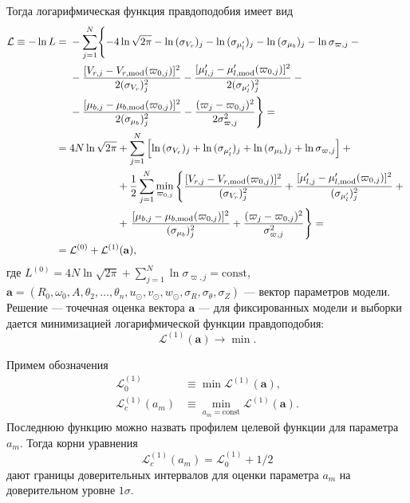 \documentclass[a4paper, oneside, 14pt]{article}
\begin{document}
Тогда логарифмическая функция правдоподобия имеет вид
%
{\allowdisplaybreaks
\begin{align}
  \label{eq:L}\nonumber
  \mathcal{L} \equiv -\ln{L} &=
  \begin{aligned}[t]
    &-\sum_{j=1}^N \Biggl\{ -4 \ln{\sqrt{2 \pi}} - \ln{(\sigma_{V_r})_j} - \ln{(\sigma_{\mu_l'})_j} - \ln{(\sigma_{\mu_b})_j} - \ln{\sigma_{\varpi,j}} - {}\\
    &-\frac{[ V_{r,j} - V_{r,\text{mod}}(\varpi_{0,j}) ]^2}{2 (\sigma_{V_r})_j^2} - \frac{[ \mu_{l,j}' - \mu_{l,\text{mod}}'(\varpi_{0,j}) ]^2}{2 (\sigma_{\mu_l'})_j^2} - {}\\
    &-\frac{[ \mu_{b,j} - \mu_{b,\text{mod}}(\varpi_{0,j}) ]^2}{2 (\sigma_{\mu_b})_j^2} - \frac{( \varpi_j - \varpi_{0,j} )^2}{2 \sigma_{\varpi,j}^2} \Biggr\} = {}
  \end{aligned}\\
  \nonumber
  &= 4 N \ln{\sqrt{2 \pi}}
  \begin{aligned}[t]
    &+ \sum_{j=1}^N \left[ \ln{(\sigma_{V_r})_j} + \ln{(\sigma_{\mu_l'})_j} + \ln{(\sigma_{\mu_b})_j} + \ln{\sigma_{\varpi,j}} \right] + {}\\
    &+ \frac{1}{2} \sum_{j=1}^N \min_{\varpi_{0,j}} \left\{ \frac{[ V_{r,j} - V_{r,\text{mod}}(\varpi_{0,j}) ]^2}{(\sigma_{V_r})_j^2} + \frac{[ \mu_{l,j}' - \mu_{l,\text{mod}}'(\varpi_{0,j}) ]^2}{(\sigma_{\mu_l'})_j^2} + {} \right.\\
    &+ \left. \frac{[ \mu_{b,j} - \mu_{b,\text{mod}}(\varpi_{0,j}) ]^2}{(\sigma_{\mu_b})_j^2} + \frac{( \varpi_j - \varpi_{0,j} )^2}{\sigma_{\varpi,j}^2} \vphantom{\frac{[ \mu_{l,j}' - \mu_{l,\text{mod}}'(\varpi_{0,j}) ]^2}{(\sigma_{\mu_l'})_j^2}} \right\} = {}
  \end{aligned}\\
  &= \mathcal{L}^{(0)} + \mathcal{L}^{(1)}(\mathbf{a}),
\end{align}
}
%
где $ L^{(0)} = 4 N \ln{\sqrt{2 \pi}} + \sum_{j=1}^N \ln{\sigma_{\varpi,j}} = \text{const} $, $ \mathbf{a} = (R_0, \omega_0, A, \theta_2, \ldots, \theta_n, u_\odot, v_\odot, w_\odot, \sigma_R, \sigma_\theta, \sigma_Z) $ --- вектор параметров модели. Решение --- точечная оценка вектора $ \mathbf{a} $ --- для фиксированных модели и выборки дается минимизацией логарифмической функции правдоподобия:
%
\begin{equation}
  \label{eq:L_1}
  \mathcal{L}^{(1)}(\mathbf{a}) \rightarrow \min.
\end{equation}

Примем обозначения
%
\begin{align}
  \mathcal{L}_0^{(1)} &\equiv \min{\mathcal{L}^{(1)}(\mathbf{a})},\\
  \label{eq:L_c}
  \mathcal{L}_c^{(1)}(a_m) &\equiv \min_{a_m = \text{const}}{\mathcal{L}^{(1)}(\mathbf{a})}.
\end{align}
%
Последнюю функцию можно назвать профилем целевой функции для параметра $ a_m $. Тогда корни уравнения
%
\begin{equation}
  \label{eq:L_c_roots}
  \mathcal{L}_c^{(1)}(a_m) = \mathcal{L}_0^{(1)} + 1 / 2
\end{equation}
%
дают границы доверительных интервалов для оценки параметра $ a_m $ на доверительном уровне $ 1 \sigma $.
\end{document}
